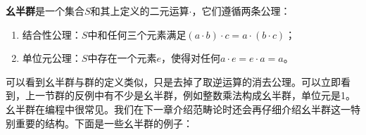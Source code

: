 \documentclass[b5paper]{ctexart}
\begin{document}
\begin{definition}
\textbf{幺半群}是一个集合$S$和其上定义的二元运算$\cdot$，它们遵循两条公理：
\begin{enumerate}
\item 结合性公理：$S$中和任何三个元素满足$(a \cdot b) \cdot c = a \cdot (b \cdot c)$；
\item 单位元公理：$S$中存在一个元素$e$，使得对任何$a \cdot e = e \cdot a = a$。
\end{enumerate}
\end{definition}

可以看到幺半群与群的定义类似，只是去掉了取逆运算的消去公理。可以立即看到，上一节群的反例中有不少是幺半群，例如整数乘法构成幺半群，单位元是1。幺半群在编程中很常见。我们在下一章介绍范畴论时还会再仔细介绍幺半群这一特别重要的结构。下面是一些幺半群的例子：
\end{document}
